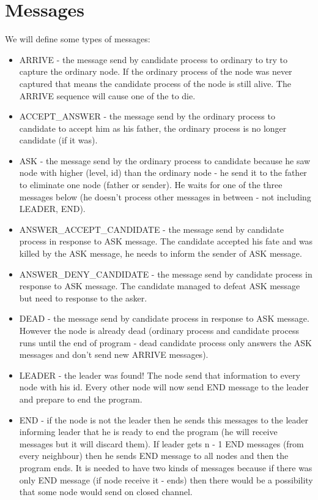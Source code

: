 \documentclass{article}
\begin{document}
\section*{Messages}
We will define some types of messages:
\begin{itemize}
    \item ARRIVE - the message send by candidate process to ordinary to try to capture the ordinary node. If the ordinary process of the node was never captured that means the candidate process of the node is still alive. The ARRIVE sequence will cause one of the to die.
    \item ACCEPT\_ANSWER - the message send by the ordinary process to candidate to accept him as his father, the ordinary process is no longer candidate (if it was).
    \item ASK - the message send by the ordinary process to candidate because he saw node with higher (level, id) than the ordinary node - he send it to the father to eliminate one node (father or sender). He waits for one of the three messages below (he doesn't process other messages in between - not including LEADER, END).
    \item ANSWER\_ACCEPT\_CANDIDATE - the message send by candidate process in response to ASK message. The candidate accepted his fate and was killed by the ASK message, he needs to inform the sender of ASK message.
    \item ANSWER\_DENY\_CANDIDATE - the message send by candidate process in response to ASK message. The candidate managed to defeat ASK message but need to response to the asker.
    \item DEAD - the message send by candidate process in response to ASK message. However the node is already dead (ordinary process and candidate process runs until the end of program - dead candidate process only answers the ASK messages and don't send new ARRIVE messages).
    \item LEADER - the leader was found! The node send that information to every node with his id. Every other node will now send END message to the leader and prepare to end the program.
    \item END - if the node is not the leader then he sends this messages to the leader informing leader that he is ready to end the program (he will receive messages but it will discard them). If leader gets n - 1 END messages (from every neighbour) then he sends END message to all nodes and then the program ends. It is needed to have two kinds of messages because if there was only END message (if node receive it - ends) then there would be a possibility that some node would send on closed channel.
\end{itemize}
\end{document}
